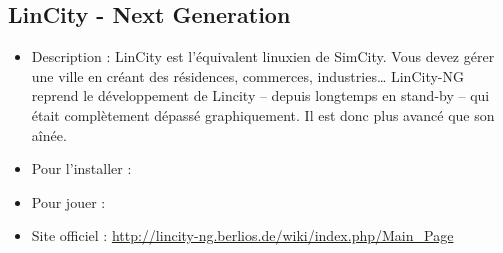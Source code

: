 \subsection{LinCity - Next Generation}
\begin{itemize}
\begingroup
{}
\item Description : LinCity est l'équivalent linuxien de SimCity. Vous devez gérer une ville en créant des résidences, commerces, industries\ldots{} LinCity-NG reprend le développement de Lincity -- depuis longtemps en stand-by -- qui était complètement dépassé graphiquement. Il est donc plus avancé que son aînée.{\par}
\endgroup
\item Pour l'installer : 
\item Pour jouer : 
\item Site officiel : \url{http://lincity-ng.berlios.de/wiki/index.php/Main_Page}{\par}
\end{itemize}
\newpage%

